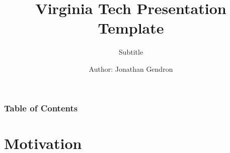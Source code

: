 \documentclass[
    11pt, %
    aspectratio=169, %
]{beamer}
\title[Middle Footer]{Virginia Tech Presentation Template}
\subtitle{Subtitle}
\author[Left Footer]{Author: Jonathan Gendron}
\institute[]{Department of Economics \\ \smallskip \textit{email@vt.edu}}
\date[Fall 20XX]
\begin{document}
\section{}
\begin{frame}
	\titlepage %

\end{frame}


\begin{frame}
	\frametitle{Table of Contents} %

	\tableofcontents %
\end{frame}

\section{Motivation} %
\end{document}
